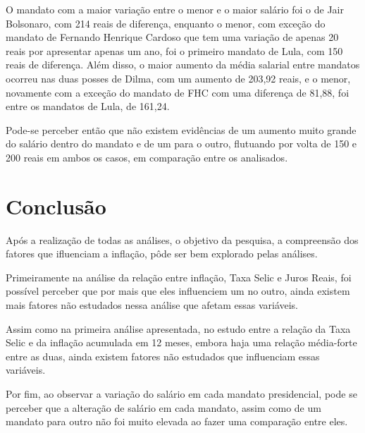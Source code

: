 \documentclass[
]{estat/estat}
\let\oldsection\section
\renewcommand\section{\clearpage\oldsection}
\begin{document}
O mandato com a maior variação entre o menor e o maior salário foi o de
Jair Bolsonaro, com 214 reais de diferença, enquanto o menor, com
exceção do mandato de Fernando Henrique Cardoso que tem uma variação de
apenas 20 reais por apresentar apenas um ano, foi o primeiro mandato de
Lula, com 150 reais de diferença. Além disso, o maior aumento da média
salarial entre mandatos ocorreu nas duas posses de Dilma, com um aumento
de 203,92 reais, e o menor, novamente com a exceção do mandato de FHC
com uma diferença de 81,88, foi entre os mandatos de Lula, de 161,24.

Pode-se perceber então que não existem evidências de um aumento muito
grande do salário dentro do mandato e de um para o outro, flutuando por
volta de 150 e 200 reais em ambos os casos, em comparação entre os
analisados.

\section{Conclusão}\label{conclusuxe3o}

Após a realização de todas as análises, o objetivo da pesquisa, a
compreensão dos fatores que ifluenciam a inflação, pôde ser bem
explorado pelas análises.

Primeiramente na análise da relação entre inflação, Taxa Selic e Juros
Reais, foi possível perceber que por mais que eles influenciem um no
outro, ainda existem mais fatores não estudados nessa análise que afetam
essas variáveis.

Assim como na primeira análise apresentada, no estudo entre a relação da
Taxa Selic e da inflação acumulada em 12 meses, embora haja uma relação
média-forte entre as duas, ainda existem fatores não estudados que
influenciam essas variáveis.

Por fim, ao observar a variação do salário em cada mandato presidencial,
pode se perceber que a alteração de salário em cada mandato, assim como
de um mandato para outro não foi muito elevada ao fazer uma comparação
entre eles.
\end{document}
